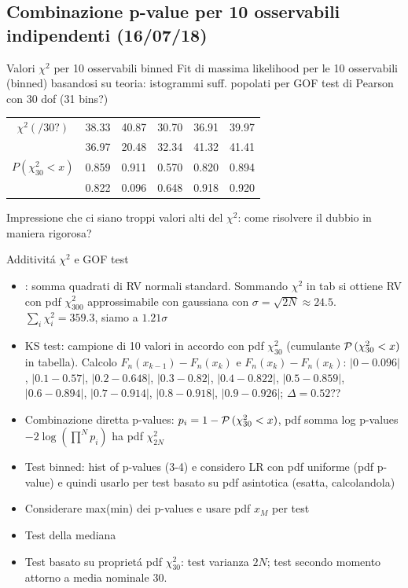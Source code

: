 \documentclass[asd-beamer.tex]{subfiles}
\begin{document}
\subsection{{Combinazione p-value per 10 osservabili indipendenti (16/07/18)}}
\begin{frame}{Valori $\chi^2$ per 10 osservabili binned}
	Fit di massima likelihood per le 10 osservabili (binned) basandosi su teoria: istogrammi suff. popolati per GOF test di Pearson con 30 dof (31 bins?)
	\begin{table}[h!]
		\centering
		\begin{tabular}{||cccccc||} 
			$\chi^2(/30?)$&38.33&40.87&30.70&36.91&39.97\\
			&36.97&20.48&32.34&41.32&41.41\\
			$P(\chi^2_{30}<x)$&0.859&0.911&0.570&0.820&0.894\\
			&0.822&0.096&0.648&0.918&0.920\\
		\end{tabular}
	\end{table}
	Impressione che ci siano troppi valori alti del $\chi^2$: come risolvere il dubbio in maniera rigorosa?
\end{frame}
\begin{frame}{Additivit\'a $\chi^2$ e GOF test}
	\begin{itemize}
	\item {}: somma quadrati di RV normali standard.
			Sommando $\chi^2$ in tab si ottiene RV con pdf $\chi^2_{300}$ approssimabile con gaussiana con $\sigma=\sqrt{2N}\approx24.5$.
			$\sum_i\chi^2_i=359.3$, siamo a $1.21\sigma$
	\item KS test: campione di 10 valori in accordo con pdf $\chi^2_{30}$ (cumulante $\operatorname{\mathcal{P}}{(\chi^2_{30}<x)}$ in tabella). Calcolo $F_n(x_{k-1})-F_n(x_k)$ e $F_n(x_k)-F_n(x_k)$:  $|0-0.096|$, $|0.1-0.57|$, $|0.2-0.648|$, $|0.3-0.82|$, $|0.4-0.822|$, $|0.5-0.859|$, $|0.6-0.894|$, $|0.7-0.914|$, $|0.8-0.918|$, $|0.9-0.926|$; $\Delta=0.52$??
	\item Combinazione diretta p-values: $p_i=1-\operatorname{\mathcal{P}}{(\chi^2_{30}<x)}$, pdf somma log p-values $-2\log{(\prod^Np_i)}$ ha pdf $\chi^2_{2N}$
	\item Test binned: hist of p-values (3-4) e considero LR con pdf uniforme (pdf p-value) e quindi usarlo per test basato su pdf asintotica (esatta, calcolandola)
	\item Considerare max(min) dei p-values e usare pdf $x_M$ per test
	\item Test della mediana
	\item Test basato su propriet\'a pdf $\chi^2_{30}$: test varianza $2N$; test secondo momento attorno a media nominale 30.
\end{itemize}
\end{frame}
\end{document}
